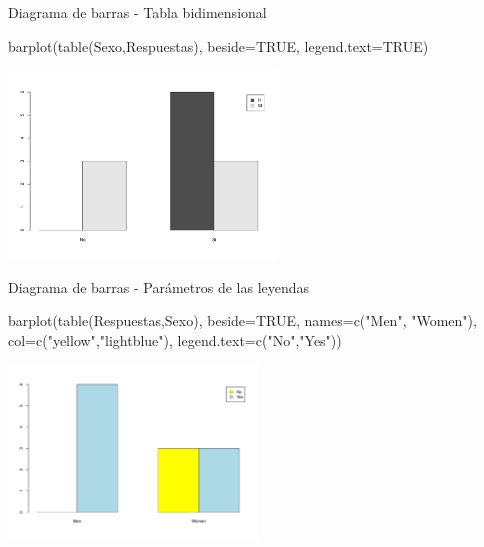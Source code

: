 \documentclass[
  ignorenonframetext,
  aspectratio=169]{beamer}
\newenvironment{Shaded}{\begin{snugshade}}{\end{snugshade}}
\newcommand{\AttributeTok}[1]{\textcolor[rgb]{0.77,0.63,0.00}{#1}}
\newcommand{\ConstantTok}[1]{\textcolor[rgb]{0.00,0.00,0.00}{#1}}
\newcommand{\FunctionTok}[1]{\textcolor[rgb]{0.00,0.00,0.00}{#1}}
\newcommand{\NormalTok}[1]{#1}
\newcommand{\StringTok}[1]{\textcolor[rgb]{0.31,0.60,0.02}{#1}}
\begin{document}
\begin{frame}[fragile]{Diagrama de barras - Tabla bidimensional}
\protect\hypertarget{diagrama-de-barras---tabla-bidimensional-1}{}
\begin{Shaded}
\begin{Highlighting}[]
\FunctionTok{barplot}\NormalTok{(}\FunctionTok{table}\NormalTok{(Sexo,Respuestas), }\AttributeTok{beside=}\ConstantTok{TRUE}\NormalTok{, }
        \AttributeTok{legend.text=}\ConstantTok{TRUE}\NormalTok{)}
\end{Highlighting}
\end{Shaded}

\begin{center}\includegraphics[width=270px]{Hora3_files/figure-beamer/unnamed-chunk-37-1} \end{center}
\end{frame}

\begin{frame}[fragile]{Diagrama de barras - Parámetros de las leyendas}
\protect\hypertarget{diagrama-de-barras---paruxe1metros-de-las-leyendas}{}
\begin{Shaded}
\begin{Highlighting}[]
\FunctionTok{barplot}\NormalTok{(}\FunctionTok{table}\NormalTok{(Respuestas,Sexo), }\AttributeTok{beside=}\ConstantTok{TRUE}\NormalTok{, }
        \AttributeTok{names=}\FunctionTok{c}\NormalTok{(}\StringTok{"Men"}\NormalTok{, }\StringTok{"Women"}\NormalTok{), }\AttributeTok{col=}\FunctionTok{c}\NormalTok{(}\StringTok{"yellow"}\NormalTok{,}\StringTok{"lightblue"}\NormalTok{),  }
        \AttributeTok{legend.text=}\FunctionTok{c}\NormalTok{(}\StringTok{"No"}\NormalTok{,}\StringTok{"Yes"}\NormalTok{))}
\end{Highlighting}
\end{Shaded}

\begin{center}\includegraphics[width=250px]{Hora3_files/figure-beamer/unnamed-chunk-38-1} \end{center}
\end{frame}
\end{document}
